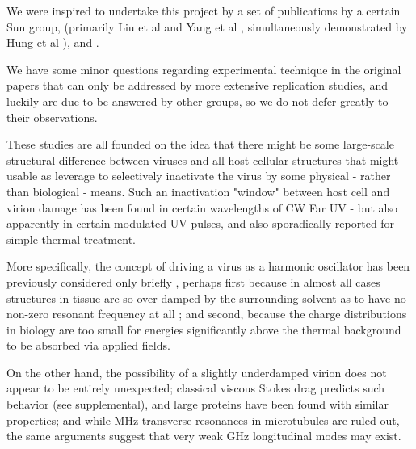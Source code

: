 \documentclass[paper.tex]{subfiles}
\begin{document}


We were inspired to undertake this project by a set of publications by a certain Sun group, (primarily Liu et al \cite{Microwave2009} and Yang et al \cite{Efficient2015}, simultaneously demonstrated by Hung et al \cite{focusing2014}), and \cite{Optical2020} \cite{Theoretical2020}.

We have some minor questions regarding experimental technique in the original papers that can only be addressed by more extensive replication studies, and luckily are due to be answered by other groups\cite{Generating}, so we do not defer greatly to their observations. 

These studies are all founded on the idea that there might be some large-scale structural difference between viruses and all host cellular structures that might usable as leverage to selectively inactivate the virus by some physical - rather than biological - means. Such an inactivation "window" between host cell and virion damage has been found in certain wavelengths of CW Far UV\cite{Germicidal2017} - but also apparently in certain modulated UV pulses\cite{Use1987a}\cite{Can1993}, and also sporadically reported for simple thermal treatment\cite{Summary}. 

More specifically, the concept of driving a virus as a harmonic oscillator has been previously considered only briefly \cite{MECHANICAL1968}\cite{Comment2004}, perhaps first because in almost all cases structures in tissue are so over-damped by the surrounding solvent\cite{Vibrational2002}\cite{Biological2002}\cite{Biophysics2000}\cite{Viscous2000} as to have no non-zero resonant frequency at all \cite{dielectric1996}\cite{gabriel1996compilation}; and second, because the charge distributions in biology are too small for energies significantly above the thermal background to be absorbed via applied fields. 

On the other hand, the possibility of a slightly underdamped virion does not appear to be entirely unexpected; classical viscous Stokes drag predicts such behavior\cite{nature1986} (see supplemental), and large proteins have been found with similar properties\cite{Microwave1994}; and while MHz transverse resonances in microtubules are ruled out\cite{Viscous2000}, the same arguments suggest that very weak GHz longitudinal modes may exist.
\end{document}
